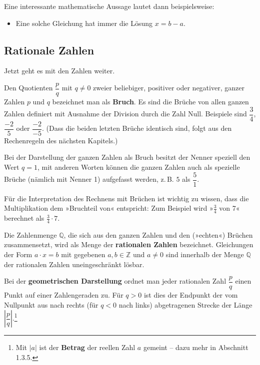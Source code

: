 Eine interessante mathematische Aussage lautet dann beispielsweise:
\begin{itemize}
  \item Eine solche Gleichung hat immer die Lösung $x = b - a$.
\end{itemize}

\subsection{Rationale Zahlen}

Jetzt geht es mit den Zahlen weiter.

Den Quotienten $\dfrac{p}{q}$ mit $q \neq 0$ zweier beliebiger, positiver oder negativer, ganzer Zahlen $p$ und $q$ bezeichnet man als \textbf{Bruch}. Es sind die Brüche von allen ganzen Zahlen definiert mit Ausnahme der Division durch die Zahl Null. Beispiele sind $\dfrac{3}{4}$, $\dfrac{-2}{5}$ oder $\dfrac{-2}{-5}$. (Dass die beiden letzten Brüche identisch sind, folgt aus den Rechenregeln des nächsten Kapitels.)

Bei der Darstellung der ganzen Zahlen als Bruch besitzt der Nenner speziell den Wert $q = 1$, mit anderen Worten können die ganzen Zahlen auch als spezielle Brüche (nämlich mit Nenner 1) aufgefasst werden, z.\,B. $5$ als $\dfrac{5}{1}$.

Für die Interpretation des Rechnens mit Brüchen ist wichtig zu wissen, dass die Multiplikation dem »Bruchteil von« entspricht: Zum Beispiel wird »$\tfrac{3}{4}$ von 7« berechnet als $\tfrac{3}{4} \cdot 7$.

Die Zahlenmenge $\mathbb{Q}$, die sich aus den ganzen Zahlen und den (»echten«) Brüchen zusammensetzt, wird als Menge der \textbf{rationalen Zahlen} bezeichnet. Gleichungen der Form $a \cdot x = b$ mit gegebenen $a, b \in \mathbb{Z}$ und $a \neq 0$ sind innerhalb der Menge $\mathbb{Q}$ der rationalen Zahlen uneingeschränkt lösbar.

Bei der \textbf{geometrischen Darstellung} ordnet man jeder rationalen Zahl $\dfrac{p}{q}$ einen Punkt auf einer Zahlengeraden zu. Für $q > 0$ ist dies der Endpunkt der vom Nullpunkt aus nach rechts (für $q < 0$ nach links) abgetragenen Strecke der Länge $\left|\dfrac{p}{q}\right|$.\footnote{Mit $|a|$ ist der \textbf{Betrag} der reellen Zahl $a$ gemeint -- dazu mehr in Abschnitt 1.3.5.}

\begin{center}
\end{center}

